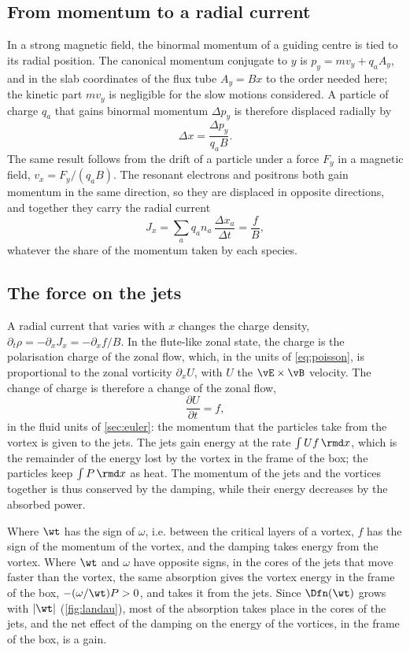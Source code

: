 \subsection{From momentum to a radial current}

In a strong magnetic field, the binormal momentum of a guiding centre is tied to its radial position. The canonical momentum conjugate to \(y\) is \(p_y = mv_y + q_aA_y\), and in the slab coordinates of the flux tube \(A_y = Bx\) to the order needed here; the kinetic part \(mv_y\) is negligible for the slow motions considered. A particle of charge \(q_a\) that gains binormal momentum \(\Delta p_y\) is therefore displaced radially by
\begin{equation}
\Delta x = \frac{\Delta p_y}{q_a B}.
\label{eq:Idisplacement}
\end{equation}
The same result follows from the drift of a particle under a force \(F_y\) in a magnetic field, \(v_x = F_y/(q_aB)\). The resonant electrons and positrons both gain momentum in the same direction, so they are displaced in opposite directions, and together they carry the radial current
\begin{equation}
J_x = \sum_a q_a n_a\,\frac{\Delta x_a}{\Delta t} = \frac{f}{B},
\label{eq:Icurrent}
\end{equation}
whatever the share of the momentum taken by each species.

\subsection{The force on the jets}

A radial current that varies with \(x\) changes the charge density, \(\partial_t\rho = -\partial_x J_x = -\partial_x f/B\). In the flute-like zonal state, the charge is the polarisation charge of the zonal flow, which, in the units of \cref{eq:poisson}, is proportional to the zonal vorticity \(\partial_x U\), with \(U\) the \(\vE\times\vB\) velocity. The change of charge is therefore a change of the zonal flow,
\begin{equation}
\frac{\partial U}{\partial t} = f ,
\label{eq:Ijets}
\end{equation}
in the fluid units of \cref{sec:euler}: the momentum that the particles take from the vortex is given to the jets. The jets gain energy at the rate \(\int U f\,\rmd x\), which is the remainder of the energy lost by the vortex in the frame of the box; the particles keep \(\int P\,\rmd x\) as heat. The momentum of the jets and the vortices together is thus conserved by the damping, while their energy decreases by the absorbed power.

Where \(\wt\) has the sign of \(\omega\), i.e. between the critical layers of a vortex, \(f\) has the sign of the momentum of the vortex, and the damping takes energy from the vortex. Where \(\wt\) and \(\omega\) have opposite signs, in the cores of the jets that move faster than the vortex, the same absorption gives the vortex energy in the frame of the box, \(-(\omega/\wt)P > 0\), and takes it from the jets. Since \(\Dfn(\wt)\) grows with \(|\wt|\) (\cref{fig:landau}), most of the absorption takes place in the cores of the jets, and the net effect of the damping on the energy of the vortices, in the frame of the box, is a gain.

